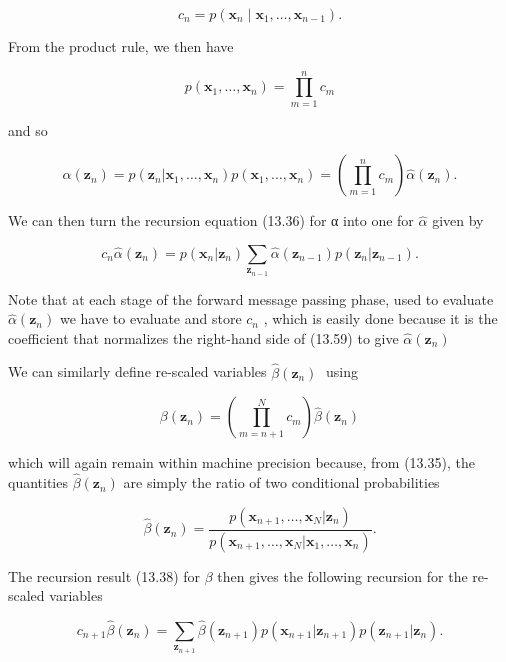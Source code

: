 \documentclass[
  10
]{article}
\begin{document}
\[
c _ {n} = p \left(\mathbf {x} _ {n} \mid \mathbf {x} _ {1}, \dots , \mathbf {x} _ {n - 1}\right).\tag{13.56}
\]

From the product rule, we then have

\[
p (\mathbf {x} _ {1}, \ldots , \mathbf {x} _ {n}) = \prod_ {m = 1} ^ {n} c _ {m}\tag{13.57}
\]

and so

\[
\alpha (\mathbf {z} _ {n}) = p (\mathbf {z} _ {n} | \mathbf {x} _ {1}, \dots , \mathbf {x} _ {n}) p (\mathbf {x} _ {1}, \dots , \mathbf {x} _ {n}) = \left(\prod_ {m = 1} ^ {n} c _ {m}\right) \widehat {\alpha} (\mathbf {z} _ {n}).\tag{13.58}
\]

We can then turn the recursion equation (13.36) for α into one for
\(\widehat { \alpha }\) given by

\[
c _ {n} \widehat {\alpha} (\mathbf {z} _ {n}) = p (\mathbf {x} _ {n} | \mathbf {z} _ {n}) \sum_ {\mathbf {z} _ {n - 1}} \widehat {\alpha} (\mathbf {z} _ {n - 1}) p (\mathbf {z} _ {n} | \mathbf {z} _ {n - 1}).\tag{13.59}
\]

Note that at each stage of the forward message passing phase, used to
evaluate \(\widehat { \alpha } ( \mathbf { z } _ { n } )\) we have to
evaluate and store \(c _ { n }\) , which is easily done because it is
the coefficient that normalizes the right-hand side of (13.59) to give
\(\widehat { \alpha } ( \mathbf { z } _ { n } )\)

We can similarly define re-scaled variables
\({ \widehat { \beta } } ( \mathbf { z } _ { n } )\) using

\[
\beta (\mathbf {z} _ {n}) = \left(\prod_ {m = n + 1} ^ {N} c _ {m}\right) \widehat {\beta} (\mathbf {z} _ {n})\tag{13.60}
\]

which will again remain within machine precision because, from (13.35),
the quantities \(\widehat { \beta } ( \mathbf { z } _ { n } )\) are
simply the ratio of two conditional probabilities

\[
\widehat {\beta} (\mathbf {z} _ {n}) = \frac {p (\mathbf {x} _ {n + 1} , \ldots , \mathbf {x} _ {N} | \mathbf {z} _ {n})}{p (\mathbf {x} _ {n + 1} , \ldots , \mathbf {x} _ {N} | \mathbf {x} _ {1} , \ldots , \mathbf {x} _ {n})}.\tag{13.61}
\]

The recursion result (13.38) for \(\beta\) then gives the following
recursion for the re-scaled variables

\[
c _ {n + 1} \widehat {\beta} (\mathbf {z} _ {n}) = \sum_ {\mathbf {z} _ {n + 1}} \widehat {\beta} (\mathbf {z} _ {n + 1}) p (\mathbf {x} _ {n + 1} | \mathbf {z} _ {n + 1}) p (\mathbf {z} _ {n + 1} | \mathbf {z} _ {n}).\tag{13.62}
\]
\end{document}
